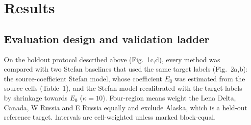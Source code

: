 
\section{Results}\label{sec:results}

\subsection{Evaluation design and validation ladder}\label{sec:results-design}

On the holdout protocol described above (Fig.~1c,d), every method was compared with two Stefan baselines that used the same target labels (Fig.~2a,b): the source-coefficient Stefan model, whose coefficient $E_0$ was estimated from the source cells (Table~1), and the Stefan model recalibrated with the target labels by shrinkage towards $E_0$ ($\kappa = 10$)\cite{Steyerberg2004}.
Four-region means weight the Lena Delta, Canada, W Russia and E Russia equally and exclude Alaska, which is a held-out reference target.
Intervals are cell-weighted unless marked block-equal.

